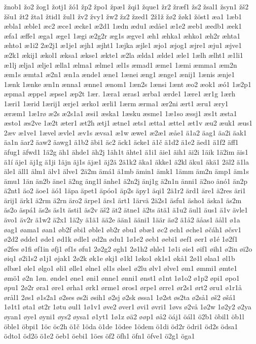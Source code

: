žnob1
žo2
žog1
žotj1
žó1
žp2
žpo1
žpæ1
žqi1
žque1
žr2
žræf1
žs2
žsal1
žsyn1
žš2
žšu1
žt2
žta1
žtid1
žul1
žv2
žvy1
žw2
žz2
žzed1
2ž1ž
žø2
žøk1
žöst1
æa1
1æb1
æbla1
æble1
æc2
æce1
æcke1
æ2d1
1ædn
ædu1
ædåe1
æ1e2
æeb1
æedb1
æek1
æfa1
æffe1
æga1
æge1
1ægi
æ2g2r
æg1s
ægve1
æh1
æhka1
æhko1
æh2r
æhta1
æhto1
æ1i2
2æ2j1
æ1je1
æjh1
æjht1
1æjka
æjle1
æjo1
æjog1
æjre1
æju1
æjve1
æ2k1
ækij1
ækol1
æksa1
ækse1
ækte1
æ2la
ælda1
ælde1
æle1
1ælh
ælht1
æ1li1
æ1lj
ælja1
ælje1
ælla1
ælma1
ælme1
æl1s
æmad1
æme1
1æmi
æmma1
æm2n
æm1s
æmta1
æ2n1
æn1a
ænde1
æne1
1ænei
æng1
ænge1
ænij1
1ænis
ænje1
1ænk
1ænke
æn1n
ænna1
ænne1
ænom1
1æn2s
1ænsi
1ænt
æo2
æok1
æó1
1æ2p1
æpma1
æppe1
æpse1
æp2t
1ær.
1æra1
æras1
ærba1
ærde1
1ære1
ær1g
1ærh
1æri1
1ærid
1ærij1
ærje1
ærko1
ærli1
1ærm
ærma1
ær2ni
ært1
æru1
æry1
æræm1
1æ1rø
æ2s
æ2s1a1
æsi1
æska1
1æsku
æsme1
1æ1so
æssj1
æs1t
æsta1
æsto1
æs2ve
1æ2t
æter1
æt2h
ætj1
ætne1
æts1
ætta1
ætte1
æt1v
æu2
æuk1
æus1
2æv
æ1ve1
1ævel
ævle1
æv1s
ævsa1
æ1w
æwe1
æ2æ1
æåe1
ä1a2
äag1
äa2i
äak1
äa1n
äar2
äaw2
äawg1
ä1b2
äbi1
äc2
äck1
äcke1
ä1č
ä1d2
ä1e2
äed1
ä1f2
äff1
äfug1
äfwd1
1ä2g
äh1
ähde1
äh2j
1äh1t
ähte1
ä1i1
äie1
äih1
äi2i
1äik
1ä2im
äis1
ä1í
äje1
äj1g
ä1ji
1äjn
äj1s
äjæ1
äj2ä
2ä1k2
äka1
äkke1
ä2kl
äku1
äkä1
2äl2
ä1la
äle1
äll1
älm1
älv1
älve1
2ä2m
ämá1
ä1mb
ämin1
ämk1
1ämm
äm2n
ämp1
äm1s
ämu1
1än
än2b
äne1
ä2ng
äng1l
änhe1
ä2n2j
änj1g
ä2n1n
änni1
ä2no
änó1
än2p
ä2nt1
äo2
äoe1
äó1
1äpa
äpet1
äpóo1
äp2s
äpy1
äqi1
2ä1r2
ärd1
äre1
ä2res
äri1
ärij1
ärk1
ä2rm
ä2rn
äro2
ärpe1
ärs1
ärt1
1ärvä
2ä2s1
äsfu1
äsho1
äska1
äs2m
äs2o
äspá1
äs2s
äs1t
ästi1
äs2v
äš2
ät2
ätne1
ä2ts
ätä1
ä1u2
äul1
äus1
ä1v
ävle1
ävo1
äv2r
ä1w2
ä2x1
1ä2y
ä1ä1
ää2e
ään1
ääni1
1äär
äø2
ä1å2
äåas1
äål1
ø1a
øag1
øama1
øan1
øb2f
øbi1
øble1
øb2r
øbu1
øbæ1
øc2
øch1
øche1
øčáh1
øčsv1
ø2d2
ødde1
øde1
ød1k
ødle1
ød2n
ødu1
1ø1e2
øeb1
øebi1
øef1
øer1
ø1é
1ø2f1
ø2fes
ø1fi
øf1in
øfj1
øf1s
øfu1
2ø2g2
øgh1
2ø1h2
øhle1
1ø1i
øie1
øif1
øih1
ø2in
øi2o
øiq1
ø2i1s2
ø1j1
øjak1
2ø2k
øk1e
økj1
ø1kl
1øko1
øk1s1
økå1
2ø1l
ølaa1
øl1b
ølbæ1
øle1
ølgo1
øli1
ølle1
ølne1
øl1s
ølse1
ø2lu
ølv1
ølve1
øm1
ømmi1
ømte1
ømö1
ø2n
1øn.
ønde1
øne1
øni1
ønne1
ønni1
ønst1
ø1nt
1ø1o2
ø1p2
øpi1
øpo1
øpu1
2ø2r
øra1
øre1
ørha1
ørk1
ørme1
øros1
ørpe1
ørre1
ør2s1
ørt2
øru1
ø1r1å
ørål1
2øs1
ø1s2a1
ø2ses
øs2i
øsih1
ø2sj
ø2sk
øssa1
1ø2st
øs2ta
ø2så1
øš2
øšá1
1ø1t1
øta1
øt2r
1øtu
øul1
1ø1v1
øve2
øver1
øvi1
øvri1
1øvs
ø2vå
1ø2w
1ø2y2
ø2ya
øyan1
øye1
øyni1
øys2
øysa1
ø1yt1
1ø1z
øä2
øøp1
øå2
öáj1
öál1
ö2b1
öbil1
öb1l
öble1
öbpi1
1öc
öc2h
ö1č
1öda
ö1de
1ödee
1ödem
ö1di
öd2r
ödri1
öd2s
ödsa1
ödto1
öd2ö
ö1e2
öeb1
öebi1
1öes
öf2
öfh1
öfn1
öfve1
ö2g1
öga1
